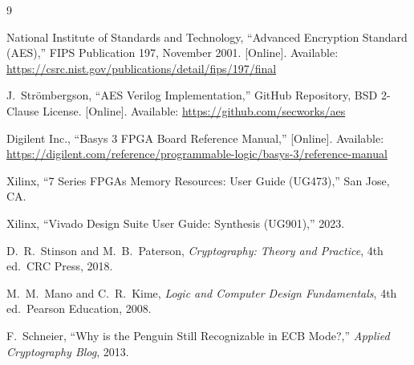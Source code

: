 \documentclass[12pt,a4paper]{article}
\begin{document}
\begin{thebibliography}{9}

National Institute of Standards and Technology, ``Advanced Encryption Standard (AES),'' FIPS Publication 197, November 2001. [Online]. Available: \url{https://csrc.nist.gov/publications/detail/fips/197/final}

J.\ Str\"{o}mbergson, ``AES Verilog Implementation,'' GitHub Repository, BSD 2-Clause License. [Online]. Available: \url{https://github.com/secworks/aes}

Digilent Inc., ``Basys 3 FPGA Board Reference Manual,'' [Online]. Available: \url{https://digilent.com/reference/programmable-logic/basys-3/reference-manual}

Xilinx, ``7 Series FPGAs Memory Resources: User Guide (UG473),'' San Jose, CA.

Xilinx, ``Vivado Design Suite User Guide: Synthesis (UG901),'' 2023.

D.\ R.\ Stinson and M.\ B.\ Paterson, \textit{Cryptography: Theory and Practice}, 4th ed.\ CRC Press, 2018.

M.\ M.\ Mano and C.\ R.\ Kime, \textit{Logic and Computer Design Fundamentals}, 4th ed.\ Pearson Education, 2008.

F.\ Schneier, ``Why is the Penguin Still Recognizable in ECB Mode?,'' \textit{Applied Cryptography Blog}, 2013.

\end{thebibliography}
\end{document}
